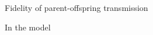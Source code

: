 \documentclass[aspectratio=169]{beamer}
\begin{document}
\begin{frame}{Fidelity of parent-offspring transmission}
{\begin{block}{In the model}
\begin{center}
\end{center}
\end{block}}
\end{frame}
\end{document}
